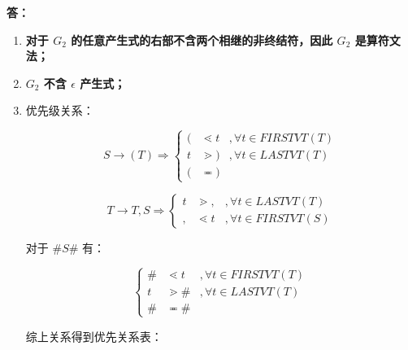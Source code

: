 \begin{enumerate}
\begin{enumerate}
        \textbf{答：}
        
        \begin{enumerate}
            \item \textbf{对于 $G_2$ 的任意产生式的右部不含两个相继的非终结符，因此 $G_2$ 是算符文法；}
            
            \item \textbf{$G_2$ 不含 $\epsilon$ 产生式；}
            
            \item 优先级关系：
            
            $$
                S \to (T) \Rightarrow \left\{
                    \begin{array}{rll}
                        ( & \lessdot t & , \forall t \in FIRSTVT(T) \\
                        t & \gtrdot ) & , \forall t \in LASTVT(T) \\
                        ( & \eqcirc )
                    \end{array}
                \right.
            $$
            
            $$
                T \to T, S \Rightarrow \left\{
                    \begin{array}{rll}
                        t & \gtrdot , & , \forall t \in LASTVT(T) \\
                        , & \lessdot t & , \forall t \in FIRSTVT(S)
                    \end{array}
                \right.
            $$
            
            对于 $\#S\#$ 有：
            
            $$
                \left\{
                    \begin{array}{rll}
                        \# & \lessdot t & , \forall t \in FIRSTVT(T) \\
                        t & \gtrdot \# & , \forall t \in LASTVT(T) \\
                        \# & \eqcirc \# 
                    \end{array}
                \right.
            $$
            
            综上关系得到优先关系表：
            

\end{enumerate}
\end{enumerate}
\end{enumerate}
